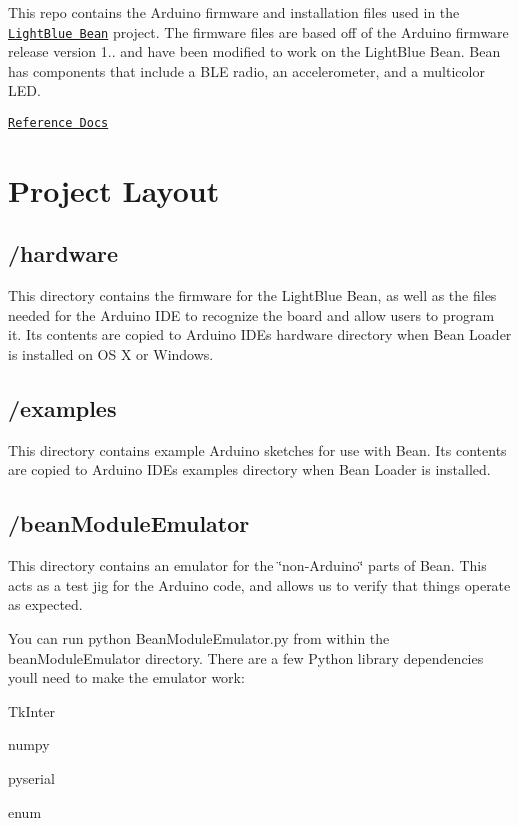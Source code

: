 This repo contains the Arduino firmware and installation files used in the \href{https://punchthrough.com/bean}{\tt Light\+Blue Bean} project. The firmware files are based off of the Arduino firmware release version 1.. and have been modified to work on the Light\+Blue Bean. Bean has components that include a B\+L\+E radio, an accelerometer, and a multicolor L\+E\+D.

\href{https://punchthrough.com/bean/reference}{\tt Reference Docs}

\section*{Project Layout}

\subsection*{/hardware}

This directory contains the firmware for the Light\+Blue Bean, as well as the files needed for the Arduino I\+D\+E to recognize the board and allow users to program it. Its contents are copied to Arduino I\+D\+E\textquotesingle{}s {\ttfamily hardware} directory when Bean Loader is installed on O\+S X or Windows.

\subsection*{/examples}

This directory contains example Arduino sketches for use with Bean. Its contents are copied to Arduino I\+D\+E\textquotesingle{}s {\ttfamily examples} directory when Bean Loader is installed.

\subsection*{/bean\+Module\+Emulator}

This directory contains an emulator for the \char`\"{}non-\/\+Arduino\char`\"{} parts of Bean. This acts as a test jig for the Arduino code, and allows us to verify that things operate as expected.

You can run {\ttfamily python Bean\+Module\+Emulator.\+py} from within the bean\+Module\+Emulator directory. There are a few Python library dependencies you\textquotesingle{}ll need to make the emulator work\+:


\begin{DoxyItemize}
\item Tk\+Inter
\item numpy
\item pyserial
\item enum
\end{DoxyItemize}

